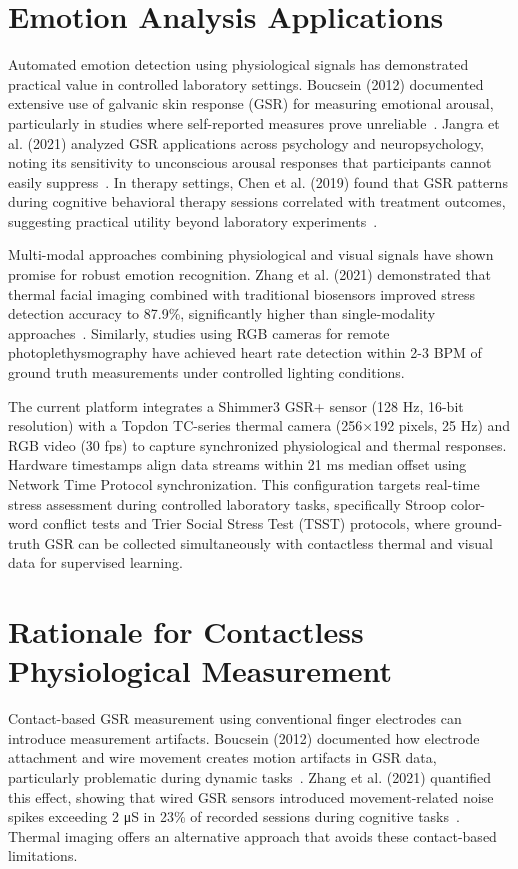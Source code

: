 \section{Emotion Analysis Applications}

Automated emotion detection using physiological signals has demonstrated practical value in controlled laboratory settings. Boucsein (2012) documented extensive use of galvanic skin response (GSR) for measuring emotional arousal, particularly in studies where self-reported measures prove unreliable~\cite{boucsein2012electrodermal}. Jangra et al. (2021) analyzed GSR applications across psychology and neuropsychology, noting its sensitivity to unconscious arousal responses that participants cannot easily suppress~\cite{jangra2021galvanic}. In therapy settings, Chen et al. (2019) found that GSR patterns during cognitive behavioral therapy sessions correlated with treatment outcomes, suggesting practical utility beyond laboratory experiments~\cite{chen2019neural}.

Multi-modal approaches combining physiological and visual signals have shown promise for robust emotion recognition. Zhang et al. (2021) demonstrated that thermal facial imaging combined with traditional biosensors improved stress detection accuracy to 87.9\%, significantly higher than single-modality approaches~\cite{zhang2021human}. Similarly, studies using RGB cameras for remote photoplethysmography have achieved heart rate detection within 2-3 BPM of ground truth measurements under controlled lighting conditions.

The current platform integrates a Shimmer3 GSR+ sensor (128 Hz, 16-bit resolution) with a Topdon TC-series thermal camera (256×192 pixels, 25 Hz) and RGB video (30 fps) to capture synchronized physiological and thermal responses. Hardware timestamps align data streams within 21 ms median offset using Network Time Protocol synchronization. This configuration targets real-time stress assessment during controlled laboratory tasks, specifically Stroop color-word conflict tests and Trier Social Stress Test (TSST) protocols, where ground-truth GSR can be collected simultaneously with contactless thermal and visual data for supervised learning.

\section{Rationale for Contactless Physiological Measurement}

Contact-based GSR measurement using conventional finger electrodes can introduce measurement artifacts. Boucsein (2012) documented how electrode attachment and wire movement creates motion artifacts in GSR data, particularly problematic during dynamic tasks~\cite{boucsein2012electrodermal}. Zhang et al. (2021) quantified this effect, showing that wired GSR sensors introduced movement-related noise spikes exceeding 2 μS in 23\% of recorded sessions during cognitive tasks~\cite{zhang2021human}. Thermal imaging offers an alternative approach that avoids these contact-based limitations.

